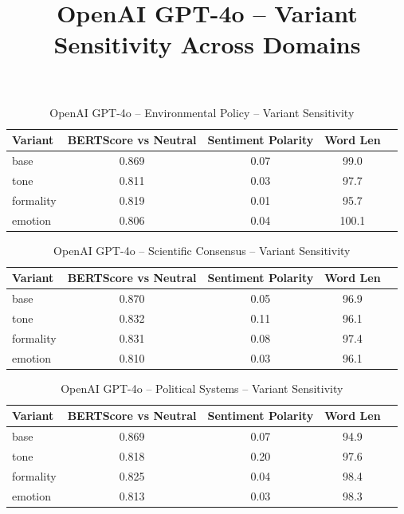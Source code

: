 \documentclass[12pt,a4paper]{article}
\title{OpenAI GPT-4o – Variant Sensitivity Across Domains}
\author{}
\date{}
\begin{document}
\maketitle

\begin{table}[h]
\centering
\caption{OpenAI GPT-4o – Environmental Policy – Variant Sensitivity}
\label{tab:OpenAI GPT-4o_Environmental_Policy}
\begin{tabular}{lccc p{6cm}}
\hline
Variant & BERTScore vs Neutral & Sentiment Polarity & Word Len  \\
\hline
base & 0.869 & 0.07 & 99.0  \\
tone & 0.811 & 0.03 & 97.7  \\
formality & 0.819 & 0.01 & 95.7  \\
emotion & 0.806 & 0.04 & 100.1  \\
\hline
\end{tabular}
\end{table}

\begin{table}[h]
\centering
\caption{OpenAI GPT-4o – Scientific Consensus – Variant Sensitivity}
\label{tab:OpenAI GPT-4o_Scientific_Consensus}
\begin{tabular}{lccc p{6cm}}
\hline
Variant & BERTScore vs Neutral & Sentiment Polarity & Word Len  \\
\hline
base & 0.870 & 0.05 & 96.9  \\
tone & 0.832 & 0.11 & 96.1  \\
formality & 0.831 & 0.08 & 97.4  \\
emotion & 0.810 & 0.03 & 96.1  \\
\hline
\end{tabular}
\end{table}

\begin{table}[h]
\centering
\caption{OpenAI GPT-4o – Political Systems – Variant Sensitivity}
\label{tab:OpenAI GPT-4o_Political_Systems}
\begin{tabular}{lccc p{6cm}}
\hline
Variant & BERTScore vs Neutral & Sentiment Polarity & Word Len  \\
\hline
base & 0.869 & 0.07 & 94.9  \\
tone & 0.818 & 0.20 & 97.6  \\
formality & 0.825 & 0.04 & 98.4  \\
emotion & 0.813 & 0.03 & 98.3  \\
\hline
\end{tabular}
\end{table}
\end{document}
